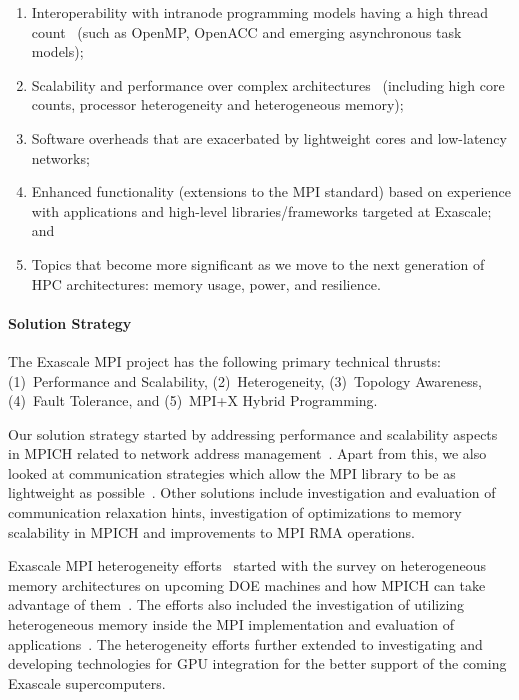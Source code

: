 \begin{enumerate}

\item Interoperability with intranode programming models having a high
  thread count~\cite{Hybrid1, Hybrid2, FT2} (such as OpenMP,
  OpenACC and emerging asynchronous task models);

\item Scalability and performance over complex
  architectures~\cite{FT2, Perf1, Perf2, Perf4} (including high core
  counts, processor heterogeneity and heterogeneous memory);

\item Software overheads that are exacerbated by lightweight cores and
  low-latency networks;

\item Enhanced functionality (extensions to the MPI standard) based on
  experience with applications and high-level libraries/frameworks
  targeted at Exascale; and

\item Topics that become more significant as we move to the next
  generation of HPC architectures: memory usage, power, and
  resilience.

\end{enumerate}

\paragraph{Solution Strategy}

The Exascale MPI project has the following primary technical thrusts:
(1)~Performance and Scalability, (2)~Heterogeneity,
(3)~Topology Awareness, (4)~Fault Tolerance, and (5)~MPI+X Hybrid Programming.

Our solution strategy started by addressing performance and
scalability aspects in MPICH related to network address
management~\cite{memscal}.  Apart from this, we also looked at
communication strategies which allow the MPI library to be as
lightweight as possible~\cite{ch41, ch42}. Other solutions include
investigation and evaluation of communication relaxation hints,
investigation of optimizations to memory scalability in MPICH and
improvements to MPI RMA operations.

Exascale MPI heterogeneity efforts~\cite{Hetero1, Hetero2, Hetero3}
started with the survey on heterogeneous memory architectures on
upcoming DOE machines and how MPICH can take advantage of
them~\cite{hexe}. The efforts also included the investigation of
utilizing heterogeneous memory inside the MPI implementation and
evaluation of applications~\cite{hetero4}. The heterogeneity efforts
further extended to investigating and developing technologies for GPU
integration for the better support of the coming Exascale
supercomputers.

